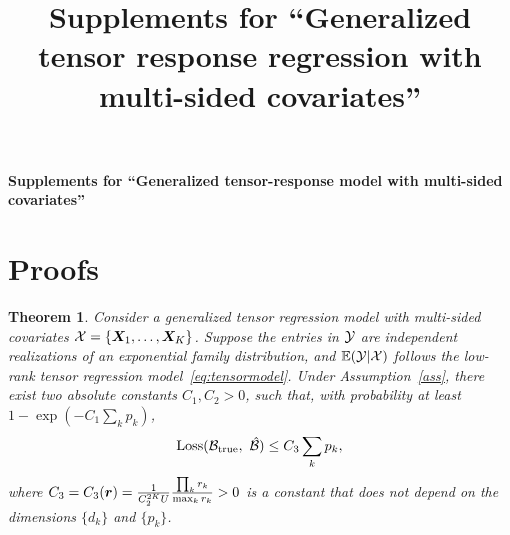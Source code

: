 \documentclass[11pt]{article}
\title{Supplements for ``Generalized tensor response regression with multi-sided covariates''}
\theoremstyle{plain}
\newtheorem{thm}{Theorem}[section]
\theoremstyle{definition}
\begin{document}
\begin{center}
\begin{spacing}{1.5}
\textbf{\Large Supplements for ``Generalized tensor-response model with multi-sided covariates''}
\end{spacing}
\end{center}

\section{Proofs}
\begin{thm}
Consider a generalized tensor regression model with multi-sided covariates $\mathcal{X}=\{\bm X_1,\ldots,\bm X_K\}$. Suppose the entries in $\mathcal{Y}$ are independent realizations of an exponential family distribution, and $\mathbb{E}(\mathcal{Y}|\mathcal{X})$ follows the low-rank tensor regression model~\eqref{eq:tensormodel}. Under Assumption~\ref{ass}, there exist two absolute constants $C_1, C_2>0$, such that, with probability at least $1-\exp(-C_1\sum_k p_k)$, 
\begin{equation}\label{eq:bound}
\text{Loss}(\mathcal{B}_{\text{true}},\ \hat {\mathcal{B}}) \leq C_3\sum_k p_k,
\end{equation}
where $C_3=C_3(\bm{r})={1\over C^{2K}_2U}{\prod_k r_k \over \max_k r_k}>0$ is a constant that does not depend on the dimensions $\{d_k\}$ and $\{p_k\}$. 
\end{thm}
\end{document}
